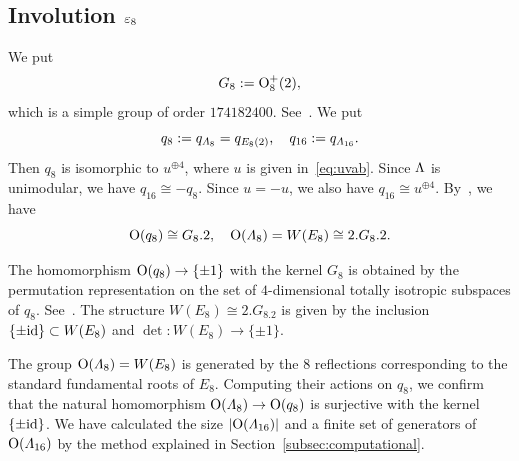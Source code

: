 \documentclass{amsart} %
\begin{document}
\subsection{Involution $\varepsilon_8$}\label{subsec:vep8}
%
We put
\[
G_8:=\mathord{\mathrm{O}}^+_8(2), 
\]
which is a simple group of order %
$174182400$.
See~\cite[page 85]{MR827219}.
%
%
We put
\[
q_8:=q_{\varLambda_8}=q_{ E_8(2)},
\quad
q_{16}:=q_{\varLambda_{16}}.
\]
Then $q_8$ 
is isomorphic to $u^{\oplus 4}$,
where $u$ is given in~\eqref{eq:uvab}.
Since $\Lambda$ is unimodular, 
we have  $q_{16}\cong -q_8$.
Since $u= -u$, 
we  also have 
$q_{16}\cong u^{\oplus 4}$.
By~\cite[page~85]{MR827219}, 
we have
\[
\mathord{\mathrm{O}}(q_8)\cong G_8.2, 
\quad 
\mathord{\mathrm{O}}(\varLambda_8)=W(E_8)\cong 2.G_8.2.
\]
%
\begin{remark}\label{rem:2G2}
The homomorphism $\mathord{\mathrm{O}}(q_8)\to \{\pm 1\}$ %
with the kernel $G_8$
is obtained by the permutation representation on
 the set of $4$-dimensional totally isotropic subspaces of 
$q_8$.
See~\cite[Section 3.8]{Wilson2009}.
The structure $W(E_8)\cong 2.G_8.2$ is given by
the inclusion $\{\pm \mathord{\mathrm{id}}\}\subset W(E_8)$ and $\det\colon W(E_8)\to \{\pm 1\}$.
\end{remark}
%
The group $\mathord{\mathrm{O}}(\varLambda_8)=W(E_8)$
is generated by the $8$ reflections
corresponding to the standard fundamental roots of $E_8$.
Computing their actions on $q_8$,
we confirm that 
 the natural homomorphism $\mathord{\mathrm{O}}(\varLambda_8)\to \mathord{\mathrm{O}}(q_8)$ is surjective
with the kernel $\{\pm \mathord{\mathrm{id}}\}$.
We have calculated the size $|\mathord{\mathrm{O}}(\varLambda_{16})|$ and a finite set of generators of $ \mathord{\mathrm{O}}(\varLambda_{16})$
by the method 
explained in Section~\ref{subsec:computational}.
% 
\end{document}
